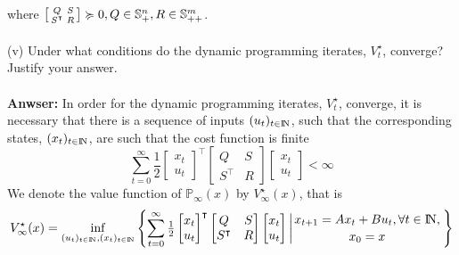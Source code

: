 \documentclass[a4paper,11pt,reqno]{amsart}
\newcommand{\N}{{\rm I\!N}}
\newcommand{\tran}{\intercal}
\begin{document}
where $\begin{bsmallmatrix}Q&S\\S^{\tran}&R\end{bsmallmatrix}\succcurlyeq 0, Q\in \mathbb{S}^n_+, R\in \mathbb{S}^m_{++}$.
\\ \\
(v) Under what conditions do the dynamic programming iterates, $V^{\star}_t$, converge? Justify your answer.
\\ \\
\textbf{Anwser:} In order for the dynamic programming iterates, $V^{\star}_t$, converge, it is necessary that there is a sequence of inputs $(u_t)_{t\in \N}$, such that the corresponding states, $(x_t)_{t\in \N}$, are such that the cost function is finite
\begin{equation}
    \sum_{t=0}^{\infty}\textstyle\frac{1}{2}
        \begin{bmatrix}
            x_t\\
            u_t
        \end{bmatrix}^{\tran}
        \begin{bmatrix}
            Q&S\\
            S^{\tran}&R
        \end{bmatrix}
        \begin{bmatrix}
            x_t\\
            u_t
        \end{bmatrix}
    <\infty
\end{equation}
We denote the value function of $\mathbb{P}_{\infty}(x)$ by $V_{\infty}^{\star}(x)$, that is
\begin{equation}
    V_{\infty}^{\star}(x)=\inf_{(u_t)_{t\in \N},(x_t)_{t\in \N}}
    \left\{
    \sum_{t=0}^{\infty}\tfrac{1}{2}
        \begin{bmatrix}
            x_t\\
            u_t
        \end{bmatrix}^{\tran}
        \begin{bmatrix}
            Q&S\\
            S^{\tran}&R
        \end{bmatrix}
        \begin{bmatrix}
            x_t\\
            u_t
        \end{bmatrix}
        \left\lvert
            x_{t+1}=Ax_t+Bu_t,\forall t\in\N,\atop
            x_0=x
        \right. 
    \right\} 
\end{equation}
\end{document}
